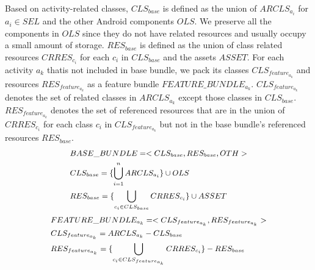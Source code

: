 Based on activity-related classes, $CLS_{base}$ is defined as the union of $ARCLS_{a_i}$ for $a_i \in SEL$ and the other Android components $OLS$. 
We preserve all the components in $OLS$ since they do not have related resources and usually occupy a small amount of storage.
$RES_{base}$ is defined as the union of class related resources $CRRES_{c_i}$ for each $c_i$ in $CLS_{base}$ and the assets $ASSET$. For each activity $a_k$ thatis  not included in base bundle, we pack its classes $CLS_{feature_{a_k}}$ and resources $RES_{feature_{a_k}}$ as a feature bundle $FEATURE\_BUNDLE_{a_k}$. $CLS_{feature_{a_k}}$ denotes the set of related classes in $ARCLS_{a_k}$ except those classes in $CLS_{base}$. $RES_{feature_{a_k}}$ denotes the set of referenced resources that are in the union of $CRRES_{c_i}$ for each class $c_i$ in $CLS_{feature_{a_k}}$ but not in the base bundle's referenced resources $RES_{base}$.
\setlength{\belowdisplayskip}{0pt} \setlength{\belowdisplayshortskip}{0pt}
\setlength{\abovedisplayskip}{0pt} \setlength{\abovedisplayshortskip}{0pt}
\begin{subequations}
\small
\label{base_bundle}
\begin{align}
	&BASE\_BUNDLE = <CLS_{base}, RES_{base}, OTH> \\
	&CLS_{base} = \{\bigcup_{i=1}^{n} ARCLS_{a_i}\}\cup OLS \\
	&RES_{base} = \{\bigcup_{c_i\in CLS_{base}} CRRES_{c_i}\}\cup ASSET
\end{align}
\end{subequations}
\begin{subequations}
\small
\label{feature_bundle}
\begin{align}
	&FEATURE\_BUNDLE_{a_k} = <CLS_{feature_{a_k}}, RES_{feature_{a_k}}> \\
	&CLS_{feature_{a_k}}  = ARCLS_{a_k}-CLS_{base} \\
	&RES_{feature_{a_k}} = \{\bigcup_{c_i\in CLS_{feature_{a_k}}} CRRES_{c_i}\}-RES_{base}
\end{align}
\end{subequations}

 

